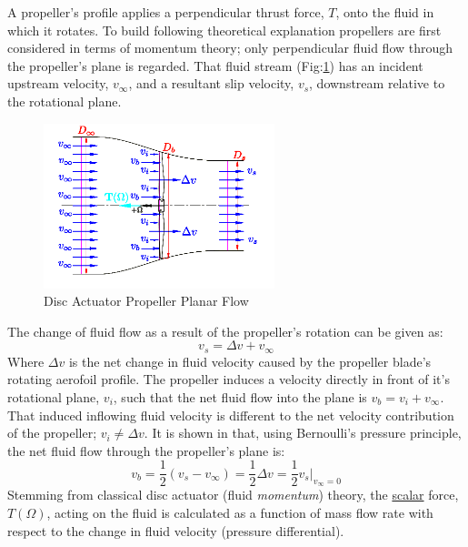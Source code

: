 \par
A propeller's profile applies a perpendicular thrust force, $T$, onto the fluid in which it rotates. To build following theoretical explanation propellers are first considered in terms of momentum theory; only perpendicular fluid flow through the propeller's plane is regarded. That fluid stream (Fig:\ref{fig:bem-flow}) has an incident upstream velocity, $v_\infty$, and a resultant slip velocity, $v_s$, downstream relative to the rotational plane.
\begin{figure}[htbp]
\centering
\includegraphics[width=0.6\textwidth]{figs/bem-flow}
\caption{Disc Actuator Propeller Planar Flow}
\label{fig:bem-flow}
\vspace{-15pt}
\end{figure}
\par
The change of fluid flow as a result of the propeller's rotation can be given as:
\begin{equation}
v_ s = \Delta v + v_\infty
\end{equation}
Where $\Delta v$ is the net change in fluid velocity caused by the propeller blade's rotating aerofoil profile. The propeller induces a velocity directly in front of it's rotational plane, $v_i$, such that the net fluid flow into the plane is $v_b=v_i+v_\infty$. That induced inflowing fluid velocity is different to the net velocity contribution of the propeller; $v_i\not=\Delta v$. It is shown in \cite{bladesforquadrotors} that, using Bernoulli's pressure principle, the net fluid flow through the propeller's plane is:
\begin{equation}\label{eq:bernoulli}
v_b = \frac{1}{2} ( v_s - v_{\infty} ) = \frac{1}{2} \Delta v = \frac{1}{2} v_s \big|_{v_\infty=0}
\end{equation}
\newpage
Stemming from classical disc actuator (fluid \emph{momentum}) theory, the \underline{scalar} force, $T(\Omega)$, acting on the fluid is calculated as a function of mass flow rate with respect to the change in fluid velocity (pressure differential).
